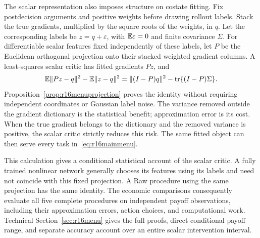 The scalar representation also imposes structure on costate fitting. Fix
postdecision arguments and positive weights before drawing rollout labels.
Stack the true gradients, multiplied by the square roots of the weights, in
$q$. Let the corresponding labels be $z=q+\varepsilon$, with
$\mathbb E\varepsilon=0$ and finite covariance $\Sigma$. For differentiable scalar
features fixed independently of these labels, let $P$ be the Euclidean
orthogonal projection onto their stacked weighted gradient columns. A
least-squares scalar critic has fitted gradients $Pz$, and
\begin{equation}
 \mathbb E\|Pz-q\|^2-\mathbb E\|z-q\|^2
   =\|(I-P)q\|^2-\operatorname{tr}\{(I-P)\Sigma\}.
 \label{eq:r16mainprojection}
\end{equation}
Proposition~\ref{prop:r16menuprojection} proves the identity without requiring
independent coordinates or Gaussian label noise. The variance removed outside
the gradient dictionary is the statistical benefit; approximation error is
its cost. When the true gradient belongs to the dictionary and the removed
variance is positive, the scalar critic strictly reduces this risk. The same
fitted object can then serve every task in~\eqref{eq:r16mainmenu}.

This calculation gives a conditional statistical account of the scalar
critic. A fully trained nonlinear network generally chooses its features
using its labels and need not coincide with this fixed projection. A Raw
procedure using the same projection has the same identity. The economic
comparisons consequently evaluate all five complete procedures on independent
payoff observations, including their approximation errors, action choices,
and computational work. Technical Section~\ref{sec:r16menu} gives the full
proofs, direct conditional payoff range, and separate accuracy account over
an entire scalar intervention interval.

